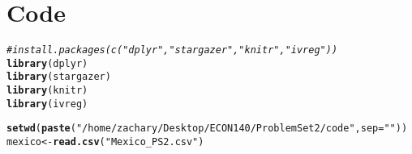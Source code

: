 \documentclass{article}\usepackage[]{graphicx}\usepackage[]{xcolor}
\makeatletter
\newcommand{\hlstr}[1]{\textcolor[rgb]{0.192,0.494,0.8}{#1}}%
\newcommand{\hlcom}[1]{\textcolor[rgb]{0.678,0.584,0.686}{\textit{#1}}}%
\newcommand{\hlstd}[1]{\textcolor[rgb]{0.345,0.345,0.345}{#1}}%
\newcommand{\hlkwb}[1]{\textcolor[rgb]{0.69,0.353,0.396}{#1}}%
\newcommand{\hlkwc}[1]{\textcolor[rgb]{0.333,0.667,0.333}{#1}}%
\newcommand{\hlkwd}[1]{\textcolor[rgb]{0.737,0.353,0.396}{\textbf{#1}}}%
\newenvironment{kframe}{%
 \def\at@end@of@kframe{}%
 \ifinner\ifhmode%
  \def\at@end@of@kframe{\end{minipage}}%
  \begin{minipage}{\columnwidth}%
 \fi\fi%
 \def\FrameCommand##1{\hskip\@totalleftmargin \hskip-\fboxsep
 \colorbox{shadecolor}{##1}\hskip-\fboxsep
     \hskip-\linewidth \hskip-\@totalleftmargin \hskip\columnwidth}%
 \MakeFramed {\advance\hsize-\width
   \@totalleftmargin\z@ \linewidth\hsize
   \@setminipage}}%
 {\par\unskip\endMakeFramed%
 \at@end@of@kframe}
\newenvironment{knitrout}{}{} %
\makeatother
\begin{document}
\pagebreak

\section*{\centering Code}
\begin{knitrout}
\color{fgcolor}\begin{kframe}
\begin{alltt}
    \hlcom{#install.packages(c("dplyr", "stargazer", "knitr", "ivreg"))}
    \hlkwd{library}\hlstd{(dplyr)}
    \hlkwd{library}\hlstd{(stargazer)}
    \hlkwd{library}\hlstd{(knitr)}
    \hlkwd{library}\hlstd{(ivreg)}

    \hlkwd{setwd}\hlstd{(}\hlkwd{paste}\hlstd{(}\hlstr{"/home/zachary/Desktop/ECON 140/Problem Set 2/code"}\hlstd{,} \hlkwc{sep}\hlstd{=}\hlstr{""}\hlstd{))}
    \hlstd{mexico} \hlkwb{<-} \hlkwd{read.csv}\hlstd{(}\hlstr{"Mexico_PS2.csv"}\hlstd{)}


\end{alltt}
\end{kframe}
\end{knitrout}
\end{document}
